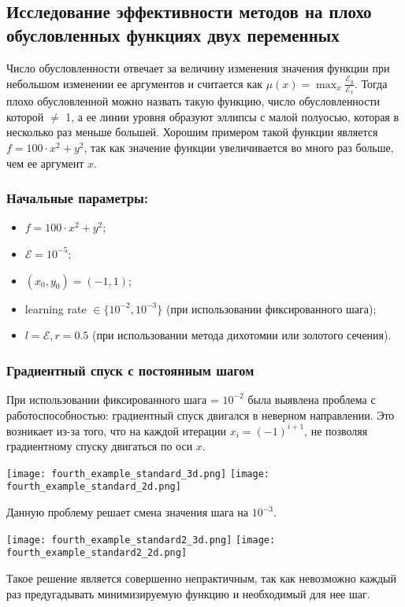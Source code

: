 \documentclass{article}
\begin{document}
\subsection*{Исследование эффективности методов на плохо обусловленных функциях двух переменных}
Число обусловленности отвечает за величину изменения значения функции при небольшом изменении ее аргументов и считается как $\mu(x) = \max_{x} \frac{\mathcal{E}_y}{\mathcal{E}_x}$. Тогда плохо обусловленной можно назвать такую функцию, число обусловленности которой $\ne$ 1, а ее линии уровня образуют эллипсы с малой полуосью, которая в несколько раз меньше большей. Хорошим примером такой функции является $f = 100 \cdot x^2 + y^2$, так как значение функции увеличивается во много раз больше, чем ее аргумент $x$.
\subsubsection*{Начальные параметры:}
\begin{itemize}
    \item $f = 100 \cdot x^2 + y^2$;
    \item $\mathcal{E} = 10^{-5}$;
    \item $(x_0, y_0) = (-1, 1)$;
    \item learning rate $\in \{10^{-2}, 10^{-3}\}$ (при использовании фиксированного шага);
    \item $l = \mathcal{E}, r = 0.5$ (при использовании метода дихотомии или золотого сечения).
\end{itemize}
\subsubsection*{Градиентный спуск с постоянным шагом}
При использовании фиксированного шага = $10^{-2}$ была выявлена проблема с работоспособностью: градиентный спуск двигался в неверном направлении. Это возникает из-за того, что на каждой итерации $x_i = (-1)^{i + 1}$, не позволяя градиентному спуску двигаться по оси $x$.
\begin{center}
    \texttt{[image: fourth\_example\_standard\_3d.png]}
    \texttt{[image: fourth\_example\_standard\_2d.png]}
    \label{fig:enter-label}
\end{center}
Данную проблему решает смена значения шага на $10^{-3}$.
\begin{center}
    \texttt{[image: fourth\_example\_standard2\_3d.png]}
    \texttt{[image: fourth\_example\_standard2\_2d.png]}
    \label{fig:enter-label}
\end{center}
Такое решение является совершенно непрактичным, так как невозможно каждый раз предугадывать минимизируемую функцию и необходимый для нее шаг.
\end{document}
